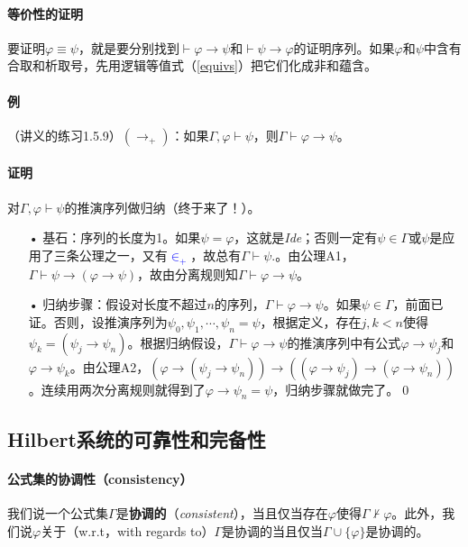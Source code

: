 \documentclass[b5paper,oneside]{ctexbook}
\newcommand{\Blue}[1]{\textcolor[named]{blue}{#1}}
\begin{document}
\paragraph{等价性的证明}要证明$\varphi\equiv\psi$，就是要分别找到$\vdash\varphi\to\psi$和$\vdash\psi\to\varphi$的证明序列。如果$\varphi$和$\psi$中含有合取和析取号，先用逻辑等值式（\ref{equivs}）把它们化成非和蕴含。
\paragraph{例}（讲义的练习1.5.9）$(\rightarrow_{+})$：如果$\Gamma, \varphi\vdash\psi$，则$\Gamma\vdash\varphi\rightarrow\psi$。
\paragraph{证明}对$\Gamma, \varphi\vdash\psi$的推演序列做归纳（终于来了！）。
\begin{enumerate}
\item[•]基石：序列的长度为1。如果$\psi = \varphi$，这就是\textit{Ide}；否则一定有$\psi \in \Gamma$或$\psi$是应用了三条公理之一，又有\Blue{$\in_+$}，故总有$\Gamma\vdash \psi$.。由公理A1，$\Gamma\vdash \psi\rightarrow (\varphi\rightarrow\psi )$，故由分离规则知$\Gamma\vdash\varphi\rightarrow\psi$。
\item[•]归纳步骤：假设对长度不超过$n$的序列，$\Gamma\vdash\varphi\rightarrow\psi$。如果$\psi\in\Gamma$，前面已证。否则，设推演序列为$\psi_0,\psi_1,\cdots ,\psi_n=\psi$，根据定义，存在$j,k<n$使得$\psi_k=(\psi_j\rightarrow \psi_n)$。根据归纳假设，$\Gamma\vdash\varphi\rightarrow\psi$的推演序列中有公式$\varphi\rightarrow\psi_j$和$\varphi\rightarrow \psi_k$。由公理A2，$(\varphi\rightarrow (\psi_j\rightarrow\psi_n ))\rightarrow ((\varphi\rightarrow\psi_j)\rightarrow(\varphi\rightarrow\psi_n))$。连续用两次分离规则就得到了$\varphi\rightarrow \psi_n =\psi$，归纳步骤就做完了。\hfill\qed
\end{enumerate}
\subsection{Hilbert系统的可靠性和完备性}
\paragraph{公式集的协调性（consistency）}我们说一个公式集$\Gamma$是\textbf{协调的}（\textit{consistent}），当且仅当存在$\varphi$使得$\Gamma\not\vdash\varphi$。此外，我们说$\varphi$关于（w.r.t，with regards to）$\Gamma$是协调的当且仅当$\Gamma\cup\{\varphi\}$是协调的。\label{cons}
\end{document}

